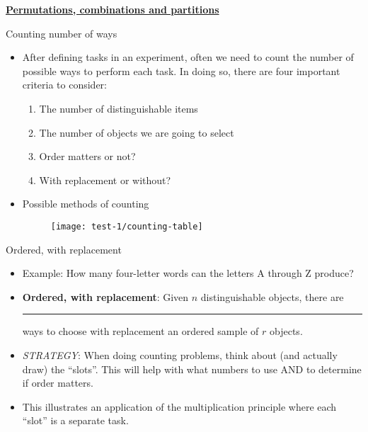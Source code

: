 \documentclass{article}
\newcommand{\bu}[1]{\textbf{\ul{#1}}}			%
\newcommand{\blankul}[1]{\rule[-1.5mm]{#1}{0.15mm}}	%
\begin{document}
\bu{Permutations, combinations and partitions}\bigskip

Counting number of ways\bigskip
\begin{itemize}
    \item After defining tasks in an experiment, often we need to count the number of possible ways to perform each task. In doing so, there are four important criteria to consider:
    \begin{enumerate}
        \item The number of distinguishable items
        \item The number of objects we are going to select
        \item Order matters or not?
        \item With replacement or without?
    \end{enumerate}\bigskip
    \item Possible methods of counting\\
    \begin{figure}[H]
        \center\texttt{[image: test-1/counting-table]}
    \end{figure}
\end{itemize}

\newpage

Ordered, with replacement\bigskip
\begin{itemize}
    \item Example: How many four-letter words can the letters A through Z produce?\vspace{30pt}
    \item \textbf{Ordered, with replacement}: Given $n$ distinguishable objects, there are \blankul{1cm} ways to choose with replacement an ordered sample of $r$ objects.\bigskip
    \item \textit{STRATEGY}: When doing counting problems, think about (and actually draw) the ``slots''. This will help with what numbers to use AND to determine if order matters.
    \item[] This illustrates an application of the multiplication principle where each ``slot'' is a separate task.
\end{itemize}\bigskip
\end{document}
